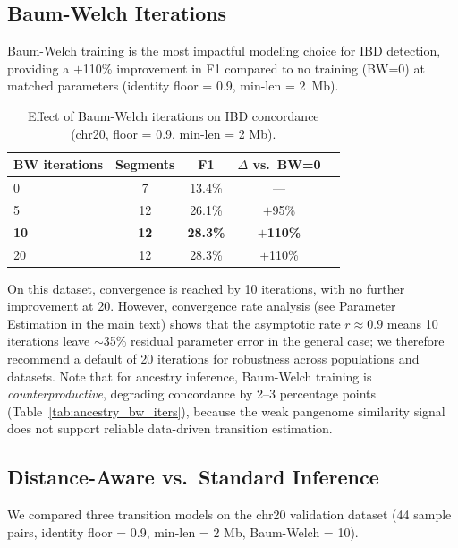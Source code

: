 \documentclass[11pt]{article}
\begin{document}
\subsection{Baum-Welch Iterations}

Baum-Welch training is the most impactful modeling choice for IBD detection, providing a $+$110\% improvement in F1 compared to no training (BW=0) at matched parameters (identity floor = 0.9, min-len = 2~Mb).

\begin{table}[ht]
\centering
\caption{Effect of Baum-Welch iterations on IBD concordance (chr20, floor = 0.9, min-len = 2 Mb).}
\label{tab:bw_iterations}
\begin{tabular}{lcccc}
\hline
\textbf{BW iterations} & \textbf{Segments} & \textbf{F1} & \textbf{$\Delta$ vs.\ BW=0} \\
\hline
0 & 7 & 13.4\% & --- \\
5 & 12 & 26.1\% & $+$95\% \\
\textbf{10} & \textbf{12} & \textbf{28.3\%} & \textbf{$+$110\%} \\
20 & 12 & 28.3\% & $+$110\% \\
\hline
\end{tabular}
\end{table}

On this dataset, convergence is reached by 10 iterations, with no further improvement at 20. However, convergence rate analysis (see Parameter Estimation in the main text) shows that the asymptotic rate $r \approx 0.9$ means 10 iterations leave $\sim$35\% residual parameter error in the general case; we therefore recommend a default of 20 iterations for robustness across populations and datasets. Note that for ancestry inference, Baum-Welch training is \emph{counterproductive}, degrading concordance by 2--3 percentage points (Table~\ref{tab:ancestry_bw_iters}), because the weak pangenome similarity signal does not support reliable data-driven transition estimation.

\subsection{Distance-Aware vs.\ Standard Inference}

We compared three transition models on the chr20 validation dataset (44 sample pairs, identity floor = 0.9, min-len = 2 Mb, Baum-Welch = 10).
\end{document}
